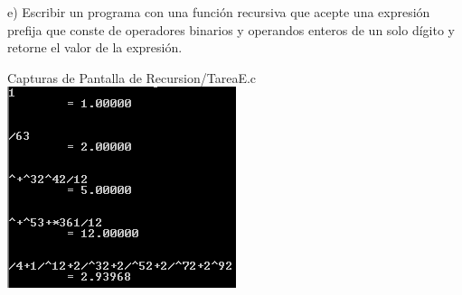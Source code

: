 e) Escribir un programa con una función recursiva que
acepte una expresión prefija que conste de operadores
binarios y operandos enteros de un solo dígito y
retorne el valor de la expresión.

Capturas de Pantalla de Recursion/TareaE.c
\newline
\includegraphics{Recursion/img/TareaE_1.png}
